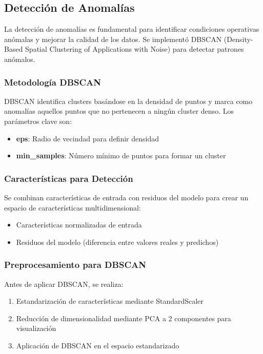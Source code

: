\documentclass[conference]{IEEEtran}
\begin{document}
	\subsection{Detección de Anomalías}
	La detección de anomalías es fundamental para identificar condiciones operativas anómalas y mejorar la calidad de los datos. Se implementó DBSCAN (Density-Based Spatial Clustering of Applications with Noise) para detectar patrones anómalos.
	
	\subsubsection{Metodología DBSCAN}
	DBSCAN identifica clusters basándose en la densidad de puntos y marca como anomalías aquellos puntos que no pertenecen a ningún cluster denso. Los parámetros clave son:
	\begin{itemize}
		\item \textbf{eps}: Radio de vecindad para definir densidad
		\item \textbf{min\_samples}: Número mínimo de puntos para formar un cluster
	\end{itemize}
	
	\subsubsection{Características para Detección}
	Se combinan características de entrada con residuos del modelo para crear un espacio de características multidimensional:
	\begin{itemize}
		\item Características normalizadas de entrada
		\item Residuos del modelo (diferencia entre valores reales y predichos)
	\end{itemize}
	
	\subsubsection{Preprocesamiento para DBSCAN}
	Antes de aplicar DBSCAN, se realiza:
	\begin{enumerate}
		\item Estandarización de características mediante StandardScaler
		\item Reducción de dimensionalidad mediante PCA a 2 componentes para visualización
		\item Aplicación de DBSCAN en el espacio estandarizado
	\end{enumerate}
	
\end{document}
